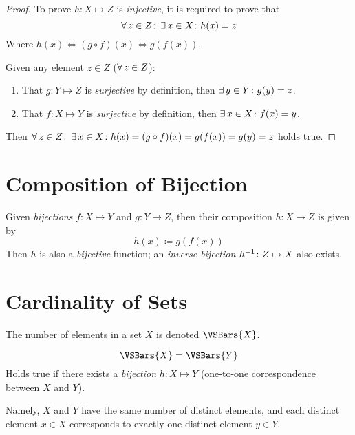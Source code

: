 \begin{proof}
    To prove $h \colon X \mapsto Z$ is \textit{injective}, it is required to prove that
    \begin{equation}
        \operatorname{\forall} z \in Z \colon \operatorname{\exists} x \in X \colon h(x) = z
    \end{equation}
    Where $h(x) \Leftrightarrow (g \circ f)(x) \Leftrightarrow g(f(x))$.
    
    Given any element $z \in Z$ ($\operatorname{\forall} z \in Z$):
    \begin{enumerate}
        \item That $g \colon Y \mapsto Z$ is \textit{surjective} by definition, then $\operatorname{\exists} y \in Y \colon g(y) = z$.
        \item That $f \colon X \mapsto Y$ is \textit{surjective} by definition, then $\operatorname{\exists} x \in X \colon f(x) = y$.
    \end{enumerate}
    Then $\operatorname{\forall} z \in Z \colon \operatorname{\exists} x \in X \colon h(x) = (g \circ f)(x) = g(f(x)) = g(y) = z$ holds true.
\end{proof}

\section{Composition of Bijection}
\begin{proposition}
    Given \textit{bijections} $f \colon X \mapsto Y$ and $g \colon Y \mapsto Z$, then their composition $h \colon X \mapsto Z$ is given by
    \begin{equation}
        h(x) \coloneqq g(f(x))
    \end{equation}
    Then $h$ is also a \textit{bijective} function; an \textit{inverse bijection} ${h}^{-1} \colon Z \mapsto X$ also exists.
\end{proposition}

\section{Cardinality of Sets}
\begin{definition}[Cardinality]
    The number of elements in a set $X$ is denoted $\VSBars{X}$.
\end{definition}

\begin{definition}
    \begin{equation}
        \VSBars{X} = \VSBars{Y}
    \end{equation}
    Holds true if there exists a \textit{bijection} $h \colon X \mapsto Y$ (one-to-one correspondence between $X$ and $Y$).
    
    Namely, $X$ and $Y$ have the same number of distinct elements, and each distinct element $x \in X$ corresponds to exactly one distinct element $y \in Y$.
\end{definition}

